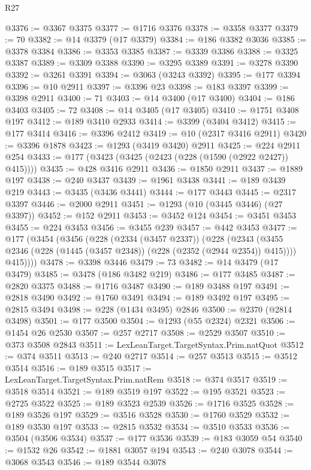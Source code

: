 \begin{lexlean}{R27}
\begin{coremodule}
@3376 := @3367 @3375
@3377 := @1716 @3376
@3378 := @3358 @3377
@3379 := 70
@3382 := @14 @3379 (@17 @3379)
@3384 := @186 @3382 @3036
@3385 := @3378 @3384
@3386 := @3353 @3385
@3387 := @3339 @3386
@3388 := @3325 @3387
@3389 := @3309 @3388
@3390 := @3295 @3389
@3391 := @3278 @3390
@3392 := @3261 @3391
@3394 := @3063 (@3243 @3392)
@3395 := @177 @3394
@3396 := @10 @2911
@3397 := @3396 @23
@3398 := @183 @3397
@3399 := @3398 @2911
@3400 := 71
@3403 := @14 @3400 (@17 @3400)
@3404 := @186 @3403
@3405 := 72
@3408 := @14 @3405 (@17 @3405)
@3410 := @1751 @3408 @197
@3412 := @189 @3410 @2933
@3414 := @3399 (@3404 @3412)
@3415 := @177 @3414
@3416 := @3396 @2412
@3419 := @10 (@2317 @3416 @2911)
@3420 := @3396 @1878
@3423 := @1293 (@3419 @3420) @2911
@3425 := @224 @2911 @254
@3433 := @177 (@3423 (@3425 (@2423 (@228 (@1590 (@2922 @2427)) @415))))
@3435 := @428 @3416 @2911
@3436 := @1850 @2911
@3437 := @1889 @197
@3438 := @240 @3437
@3439 := @1961 @3438
@3441 := @189 @3439 @219
@3443 := @3435 (@3436 @3441)
@3444 := @177 @3443
@3445 := @2317 @3397
@3446 := @2000 @2911
@3451 := @1293 (@10 (@3445 @3446) (@27 @3397))
@3452 := @152 @2911
@3453 := @3452 @124
@3454 := @3451 @3453
@3455 := @224 @3453
@3456 := @3455 @239
@3457 := @442 @3453
@3477 := @177
    (@3454
      (@3456
        (@228
          (@2334 (@3457 @2337))
          (@228
            (@2343 (@3455 @2346 (@228 (@1445 (@3457 @2348)) (@228 (@2352 (@2944 @2354)) @415))))
            @415))))
@3478 := @3398 @3446
@3479 := 73
@3482 := @14 @3479 (@17 @3479)
@3485 := @3478 (@186 @3482 @219)
@3486 := @177 @3485
@3487 := @2820 @3375
@3488 := @1716 @3487
@3490 := @189 @3488 @197
@3491 := @2818 @3490
@3492 := @1760 @3491
@3494 := @189 @3492 @197
@3495 := @2815 @3494
@3498 := @228 (@1434 @3495) @2846
@3500 := @2370 (@2814 @3498)
@3501 := @177 @3500
@3504 := @1293 (@55 @2324) @2321
@3506 := @1454 @26 @2530
@3507 := @257 @2717
@3508 := @2529 @3507
@3510 := @373 @3508 @2843
@3511 := LexLeanTarget.TargetSyntax.Prim.natQuot
@3512 := @374 @3511
@3513 := @240 @2717
@3514 := @257 @3513
@3515 := @3512 @3514
@3516 := @189 @3515
@3517 := LexLeanTarget.TargetSyntax.Prim.natRem
@3518 := @374 @3517
@3519 := @3518 @3514
@3521 := @189 @3519 @197
@3522 := @195 @3521
@3523 := @2725 @3522
@3525 := @189 @3523 @2539
@3526 := @1716 @3525
@3528 := @189 @3526 @197
@3529 := @3516 @3528
@3530 := @1760 @3529
@3532 := @189 @3530 @197
@3533 := @2815 @3532
@3534 := @3510 @3533
@3536 := @3504 (@3506 @3534)
@3537 := @177 @3536
@3539 := @183 @3059 @54
@3540 := @1532 @26
@3542 := @1881 @3057 @194
@3543 := @240 @3078
@3544 := @3068 @3543
@3546 := @189 @3544 @3078

\end{coremodule}
\end{lexlean}
